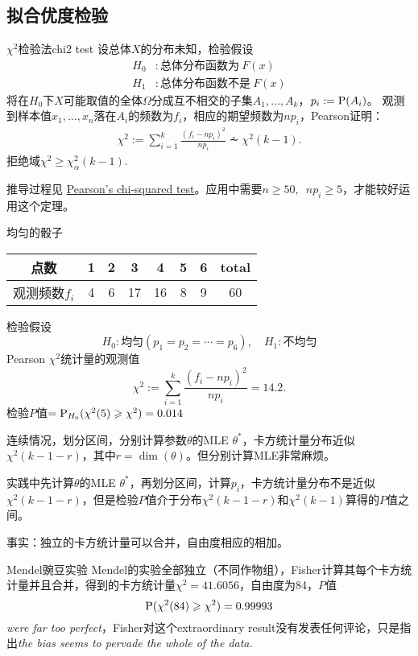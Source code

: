 \subsection{拟合优度检验}
\begin{theorem}{$\chi^2$检验法}{chi2 test}
	设总体$X$的分布未知，检验假设
	\begin{align*}
		H_0&:\text{总体分布函数为}~F(x)\\
		H_1&:\text{总体分布函数不是}~F(x)
	\end{align*}
	将在$H_0$下$X$可能取值的全体$\Omega$分成互不相交的子集$A_1,\ldots,A_k$，$p_i:=\P(A_i)$。
	观测到样本值$x_1,\ldots,x_n$落在$A_i$的频数为$f_i$，相应的期望频数为$np_i$，Pearson证明：
	\begin{align}
		\chi^2:=\sum_{i=1}^k\frac{(f_i-np_i)^2}{np_i}\dotsim\chi^2(k-1).
	\end{align}
	拒绝域$\chi^2\geqslant\chi^2_\alpha(k-1).$
\end{theorem}
推导过程见 \href{https://en.wikipedia.org/wiki/Pearson%27s_chi-squared_test}{Pearson's chi-squared test}。应用中需要$n\geqslant 50,\enspace np_i\geqslant 5$，才能较好运用这个定理。
\begin{example}{均匀的骰子}{}
	\begin{center}
		\begin{tabular}{cccccccc}
			\toprule
			点数&1&2&3&4&5&6&total\\
			\midrule
			观测频数$f_i$&4&6&17&16&8&9&60\\
			\bottomrule
		\end{tabular}
	\end{center}
	检验假设
	\[
		H_0:\text{均匀}(p_1=p_2=\cdots=p_6),\quad H_1:\text{不均匀}
	\]
	Pearson $\chi^2$统计量的观测值
	\[
		\chi^2:=\sum_{i=1}^k\frac{(f_i-np_i)^2}{np_i}=14.2.
	\]
	检验$P$值$=\P_{H_0}(\chi^2(5)\geqslant\chi^2)=0.014$
\end{example}
连续情况，划分区间，分别计算参数$\theta$的MLE $\theta^\ast$，卡方统计量分布近似$\chi^2(k-1-r)$，其中$r=\dim(\theta)$。但分别计算MLE非常麻烦。

实践中先计算$\theta$的MLE $\theta^\ast$，再划分区间，计算$p_i$，卡方统计量分布不是近似$\chi^2(k-1-r)$，但是检验$P$值介于分布$\chi^2(k-1-r)$和$\chi^2(k-1)$算得的$P$值之间。

事实：独立的卡方统计量可以合并，自由度相应的相加。
\begin{example}{Mendel豌豆实验}{}
	Mendel的实验全部独立（不同作物组），Fisher计算其每个卡方统计量并且合并，得到的卡方统计量$\chi^2=41.6056$，自由度为84，$P$值
	\[
		\P(\chi^2(84)\geqslant\chi^2)=0.99993
	\]
	\textit{were far too perfect}，Fisher对这个extraordinary result没有发表任何评论，只是指出\textit{the bias seems to pervade the whole of the data.}
\end{example}
